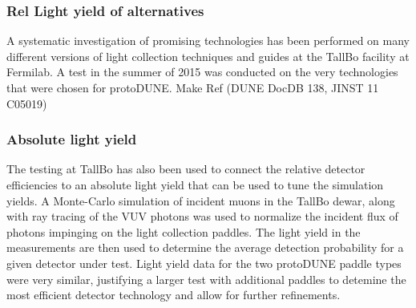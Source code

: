 \subsubsection{Rel Light yield of alternatives}
A systematic investigation of promising technologies has been performed on 
many different versions of light collection techniques and guides at the 
TallBo facility at Fermilab.
A test in the summer of 2015 was conducted on the very technologies that 
were chosen for protoDUNE. Make Ref (DUNE DocDB 138, JINST 11 C05019)
 

\subsubsection{Absolute light yield}
The testing at TallBo has also been used to connect the relative detector
efficiencies to an absolute light yield that can be used to tune the simulation
yields.  
A Monte-Carlo simulation of incident muons in the TallBo dewar, along with ray tracing
of the VUV photons was used to normalize the incident flux of photons impinging on the
light collection paddles.  
The light yield in the measurements are then used to determine the average detection 
probability for a given detector under test.
Light yield data for the two protoDUNE paddle types were very similar, justifying
a larger test with additional paddles to detemine the most efficient detector 
technology and allow for further refinements.

